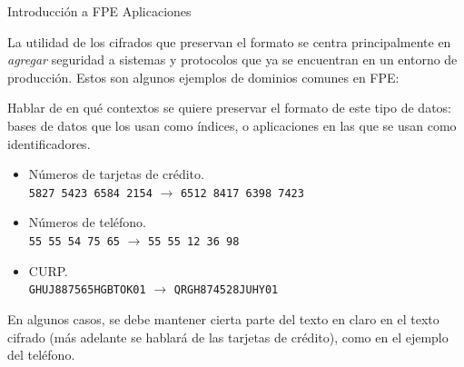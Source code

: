 \begin{frame}{Introducción a FPE}
  {Aplicaciones}

  La utilidad de los cifrados que preservan el formato se centra principalmente
  en \textit{agregar} seguridad a sistemas y protocolos que ya se encuentran
  en un entorno de producción. Estos son algunos ejemplos de dominios
  comunes en FPE:

  {
    Hablar de en qué contextos se quiere preservar el formato de este tipo
    de datos: bases de datos que los usan como índices, o aplicaciones en
    las que se usan como identificadores.
  }

  \begin{itemize}

    \item<2-> Números de tarjetas de crédito. \\
      \texttt{5827 5423 6584 2154} $ \rightarrow $ \texttt{6512 8417 6398 7423}

    \item<3-> Números de teléfono. \\
      \texttt{55 55 54 75 65} $ \rightarrow $ \texttt{55 55 12 36 98}

    \item<4-> CURP. \\
      \texttt{GHUJ887565HGBTOK01} $ \rightarrow $ \texttt{QRGH874528JUHY01}

  \end{itemize}

  {
    En algunos casos, se debe mantener cierta parte del texto en claro
    en el texto cifrado (más adelante se hablará de las tarjetas de crédito),
    como en el ejemplo del teléfono.
  }

\end{frame}
